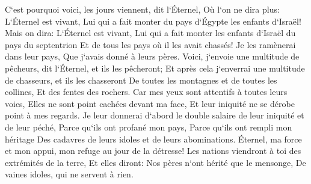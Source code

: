 \verse C`est pourquoi voici, les jours viennent, dit l`Éternel, Où l`on ne dira plus: L`Éternel est vivant, Lui qui a fait monter du pays d`Égypte les enfants d`Israël! 
\verse Mais on dira: L`Éternel est vivant, Lui qui a fait monter les enfants d`Israël du pays du septentrion Et de tous les pays où il les avait chassés! Je les ramènerai dans leur pays, Que j`avais donné à leurs pères. 
\verse Voici, j`envoie une multitude de pêcheurs, dit l`Éternel, et ils les pêcheront; Et après cela j`enverrai une multitude de chasseurs, et ils les chasseront De toutes les montagnes et de toutes les collines, Et des fentes des rochers. 
\verse Car mes yeux sont attentifs à toutes leurs voies, Elles ne sont point cachées devant ma face, Et leur iniquité ne se dérobe point à mes regards. 
\verse Je leur donnerai d`abord le double salaire de leur iniquité et de leur péché, Parce qu`ils ont profané mon pays, Parce qu`ils ont rempli mon héritage Des cadavres de leurs idoles et de leurs abominations. 
\verse Éternel, ma force et mon appui, mon refuge au jour de la détresse! Les nations viendront à toi des extrémités de la terre, Et elles diront: Nos pères n`ont hérité que le mensonge, De vaines idoles, qui ne servent à rien. 
